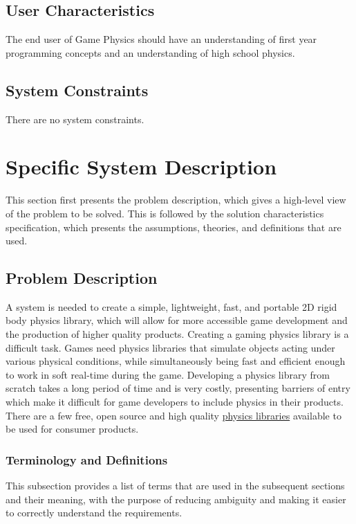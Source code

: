 \documentclass[12pt]{article}
\begin{document}
\subsection{User Characteristics}
\label{Sec:UserChars}
The end user of Game Physics should have an understanding of first year programming concepts and an understanding of high school physics.

\subsection{System Constraints}
\label{Sec:SysConstraints}
There are no system constraints.

\section{Specific System Description}
\label{Sec:SpecSystDesc}
This section first presents the problem description, which gives a high-level view of the problem to be solved. This is followed by the solution characteristics specification, which presents the assumptions, theories, and definitions that are used.

\subsection{Problem Description}
\label{Sec:ProbDesc}
A system is needed to create a simple, lightweight, fast, and portable 2D rigid body physics library, which will allow for more accessible game development and the production of higher quality products. Creating a gaming physics library is a difficult task. Games need physics libraries that simulate objects acting under various physical conditions, while simultaneously being fast and efficient enough to work in soft real-time during the game. Developing a physics library from scratch takes a long period of time and is very costly, presenting barriers of entry which make it difficult for game developers to include physics in their products. There are a few free, open source and high quality \hyperref[Sec:offShelfSolns]{physics libraries} available to be used for consumer products.

\subsubsection{Terminology and Definitions}
\label{Sec:TermDefs}
This subsection provides a list of terms that are used in the subsequent sections and their meaning, with the purpose of reducing ambiguity and making it easier to correctly understand the requirements.
\end{document}
